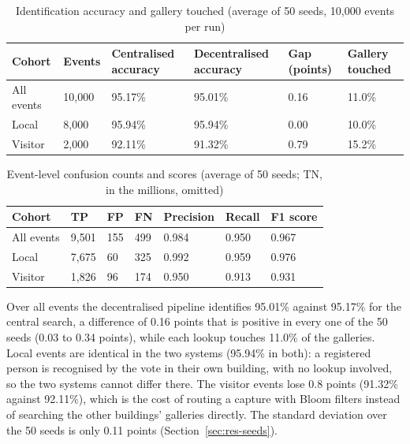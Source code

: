 \documentclass[12pt,a4paper,oneside]{report}
\begin{document}
\begin{table}[htbp]
\centering
\caption{Identification accuracy and gallery touched (average of 50 seeds, 10,000 events per run)}\label{tab:central}
{\small\setlength{\tabcolsep}{4pt}\renewcommand{\arraystretch}{1.2}
\begin{tabular}{|p{2.97cm}|p{1.67cm}|p{2.41cm}|p{2.60cm}|p{1.67cm}|p{2.04cm}|}\hline
\textbf{Cohort} & \textbf{Events} & \textbf{Centralised accuracy} & \textbf{Decentralised accuracy} & \textbf{Gap (points)} & \textbf{Gallery touched}\\\hline
All events & 10,000 & 95.17\% & 95.01\% & 0.16 & 11.0\%\\\hline
Local & 8,000 & 95.94\% & 95.94\% & 0.00 & 10.0\%\\\hline
Visitor & 2,000 & 92.11\% & 91.32\% & 0.79 & 15.2\%\\\hline
\end{tabular}}
\end{table}

\begin{table}[htbp]
\centering
\caption{Event-level confusion counts and scores (average of 50 seeds; TN, in the millions, omitted)}\label{tab:events}
{\small\setlength{\tabcolsep}{4pt}\renewcommand{\arraystretch}{1.2}
\begin{tabular}{|p{2.97cm}|p{1.78cm}|p{1.48cm}|p{1.48cm}|p{1.98cm}|p{1.78cm}|p{1.58cm}|}\hline
\textbf{Cohort} & \textbf{TP} & \textbf{FP} & \textbf{FN} & \textbf{Precision} & \textbf{Recall} & \textbf{F1 score}\\\hline
All events & 9,501 & 155 & 499 & 0.984 & 0.950 & 0.967\\\hline
Local & 7,675 & 60 & 325 & 0.992 & 0.959 & 0.976\\\hline
Visitor & 1,826 & 96 & 174 & 0.950 & 0.913 & 0.931\\\hline
\end{tabular}}
\end{table}

Over all events the decentralised pipeline identifies 95.01\% against 95.17\% for the central search, a difference of 0.16 points that is positive in every one of the 50 seeds (0.03 to 0.34 points), while each lookup touches 11.0\% of the galleries. Local events are identical in the two systems (95.94\% in both): a registered person is recognised by the vote in their own building, with no lookup involved, so the two systems cannot differ there. The visitor events lose 0.8 points (91.32\% against 92.11\%), which is the cost of routing a capture with Bloom filters instead of searching the other buildings' galleries directly. The standard deviation over the 50 seeds is only 0.11 points (Section~\ref{sec:res-seeds}).
\end{document}
